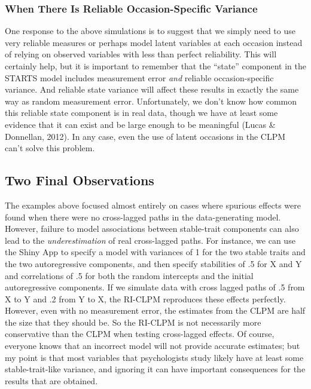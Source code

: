 \documentclass[
  english,
  man,floatsintext]{apa6}
\begin{document}
\hypertarget{when-there-is-reliable-occasion-specific-variance}{%
\subsubsection{When There Is Reliable Occasion-Specific Variance}\label{when-there-is-reliable-occasion-specific-variance}}

One response to the above simulations is to suggest that we simply need to use very reliable measures or perhaps model latent variables at each occasion instead of relying on observed variables with less than perfect reliability. This will certainly help, but it is important to remember that the ``state'' component in the STARTS model includes measurement error \emph{and} reliable occasion-specific variance. And reliable state variance will affect these results in exactly the same way as random measurement error. Unfortunately, we don't know how common this reliable state component is in real data, though we have at least some evidence that it can exist and be large enough to be meaningful (Lucas \& Donnellan, 2012). In any case, even the use of latent occasions in the CLPM can't solve this problem.

\hypertarget{two-final-observations}{%
\subsection{Two Final Observations}\label{two-final-observations}}

The examples above focused almost entirely on cases where spurious effects were found when there were no cross-lagged paths in the data-generating model. However, failure to model associations between stable-trait components can also lead to the \emph{underestimation} of real cross-lagged paths. For instance, we can use the Shiny App to specify a model with variances of 1 for the two stable traits and the two autoregressive components, and then specify stabilities of .5 for X and Y and correlations of .5 for both the random intercepts and the initial autoregressive components. If we simulate data with cross lagged paths of .5 from X to Y and .2 from Y to X, the RI-CLPM reproduces these effects perfectly. However, even with no measurement error, the estimates from the CLPM are half the size that they should be. So the RI-CLPM is not necessarily more conservative than the CLPM when testing cross-lagged effects. Of course, everyone knows that an incorrect model will not provide accurate estimates; but my point is that most variables that psychologists study likely have at least some stable-trait-like variance, and ignoring it can have important consequences for the results that are obtained.
\end{document}
